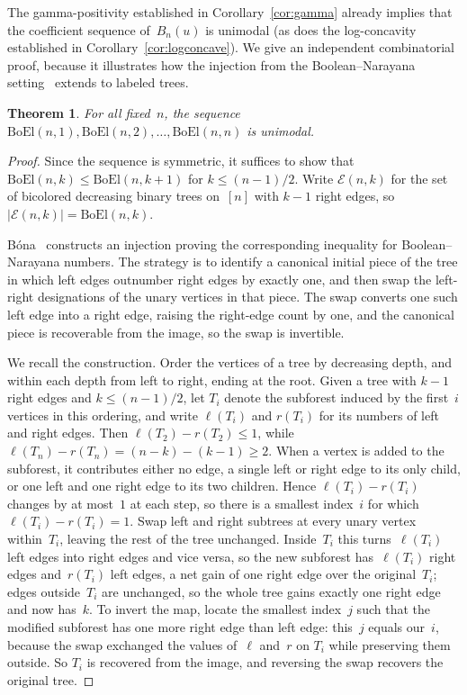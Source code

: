\documentclass[10pt]{article}
\theoremstyle{plain}
\newtheorem{theorem}{Theorem}[section]
\newcommand{\boel}{\mathrm{BoEl}}
\begin{document}
The gamma-positivity established in Corollary~\ref{cor:gamma} already implies that the coefficient sequence of~$B_n(u)$ is unimodal (as does the log-concavity established in Corollary~\ref{cor:logconcave}). We give an independent combinatorial proof, because it illustrates how the injection from the Boolean--Narayana setting~\cite{bona:boolean--naraya:} extends to labeled trees.

\begin{theorem}
\label{thm:unimodal}
For all fixed~$n$, the sequence $\boel(n,1), \boel(n,2), \ldots, \boel(n,n)$ is unimodal.
\end{theorem}

\begin{proof}
Since the sequence is symmetric, it suffices to show that $\boel(n,k) \leq \boel(n,k+1)$ for $k \leq (n-1)/2$. Write $\mathcal{E}(n,k)$ for the set of bicolored decreasing binary trees on~$[n]$ with $k-1$ right edges, so $|\mathcal{E}(n,k)| = \boel(n,k)$.

B\'ona~\cite{bona:boolean--naraya:} constructs an injection proving the corresponding inequality for Boolean--Narayana numbers. The strategy is to identify a canonical initial piece of the tree in which left edges outnumber right edges by exactly one, and then swap the left-right designations of the unary vertices in that piece. The swap converts one such left edge into a right edge, raising the right-edge count by one, and the canonical piece is recoverable from the image, so the swap is invertible.

We recall the construction. Order the vertices of a tree by decreasing depth, and within each depth from left to right, ending at the root. Given a tree with $k-1$ right edges and $k \leq (n-1)/2$, let $T_i$ denote the subforest induced by the first~$i$ vertices in this ordering, and write $\ell(T_i)$ and $r(T_i)$ for its numbers of left and right edges. Then $\ell(T_2) - r(T_2) \leq 1$, while $\ell(T_n) - r(T_n) = (n-k) - (k-1) \geq 2$. When a vertex is added to the subforest, it contributes either no edge, a single left or right edge to its only child, or one left and one right edge to its two children. Hence $\ell(T_i) - r(T_i)$ changes by at most~$1$ at each step, so there is a smallest index~$i$ for which $\ell(T_i) - r(T_i) = 1$. Swap left and right subtrees at every unary vertex within~$T_i$, leaving the rest of the tree unchanged. Inside~$T_i$ this turns~${\ell(T_i)}$ left edges into right edges and vice versa, so the new subforest has~${\ell(T_i)}$ right edges and~${r(T_i)}$ left edges, a net gain of one right edge over the original~$T_i$; edges outside~$T_i$ are unchanged, so the whole tree gains exactly one right edge and now has~$k$. To invert the map, locate the smallest index~$j$ such that the modified subforest has one more right edge than left edge: this~$j$ equals our~$i$, because the swap exchanged the values of~$\ell$ and~$r$ on $T_i$ while preserving them outside. So $T_i$ is recovered from the image, and reversing the swap recovers the original tree.


\end{proof}
\end{document}
